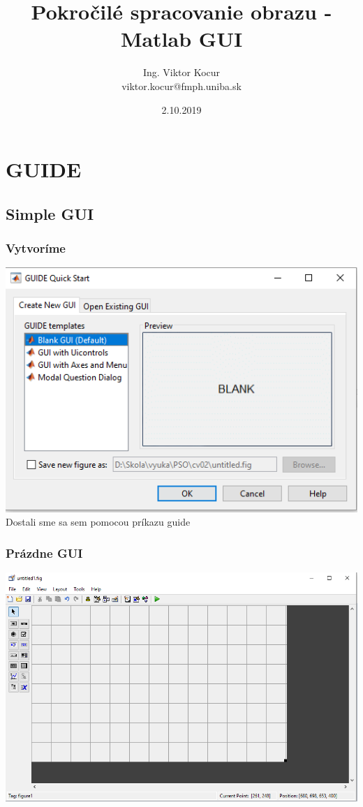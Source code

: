 \documentclass{beamer}
\title[2. cvičenie]{Pokročilé spracovanie obrazu - Matlab GUI}
\author[Kocur]{Ing. Viktor Kocur \\{\small viktor.kocur@fmph.uniba.sk}}
\institute{DAI FMFI UK}
\date{2.10.2019}
\begin{document}

\begin{frame}
  \titlepage
\end{frame}

\section{GUIDE}

\subsection{Simple GUI}

\begin{frame}
  \frametitle{Vytvoríme}
  \centering
  \includegraphics[width=\textwidth, height=0.6\textheight,keepaspectratio]{screens/start.png}\\
  Dostali sme sa sem pomocou príkazu guide
\end{frame}

\begin{frame}
  \frametitle{Prázdne GUI}
  \centering
  \includegraphics[width=\textwidth, height=0.8\textheight,keepaspectratio]{screens/empty.png}
\end{frame}
\end{document}

